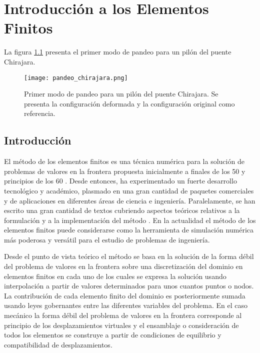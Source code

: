 %
\chapter{Introducción a los Elementos Finitos}
\graphicspath{{img/FEM/}}

La figura \ref{fig:chirajara} presenta el primer modo de pandeo para un pilón del puente Chirajara.
\begin{figure}[H]
    \centering
    \texttt{[image: pandeo\_chirajara.png]}
    \caption{Primer modo de pandeo para un pilón del puente Chirajara. Se 
    presenta la configuración deformada y la configuración original como 
    referencia.}
    \label{fig:chirajara}
\end{figure}

\section{Introducción}

El método de los elementos finitos es una técnica numérica para la solución de problemas de valores en la frontera propuesta inicialmente a finales de los 50 y principios de los 60  \cite{clough65, turner56}. Desde entonces, ha experimentado un fuerte desarrollo tecnológico y académico, plasmado en una gran cantidad de paquetes comerciales y de aplicaciones en diferentes áreas de ciencia e ingeniería. Paralelamente, se han escrito una gran cantidad de textos cubriendo aspectos teóricos relativos a la formulación y a la implementación del método \cite{book:bathe, book:hughes,  book:reddy, book:zienkiewicz}. En la actualidad el método de los elementos finitos puede considerarse como la herramienta de simulación numérica más poderosa y versátil para el estudio de problemas de ingeniería.

Desde el punto de vista teórico el método se basa en la solución de la forma débil del problema de valores en la frontera sobre una discretización del dominio en elementos finitos en cada uno de los cuales se expresa la solución usando interpolación a partir de valores determinados para unos cuantos puntos o nodos. La contribución de cada elemento finito del dominio es posteriormente sumada usando leyes gobernantes entre las diferentes variables del problema. En el caso mecánico la forma débil del problema de valores en la frontera corresponde al principio de los desplazamientos virtuales y el ensamblaje o consideración de todos los elementos se construye a partir de condiciones de equilibrio y compatibilidad de desplazamientos.

